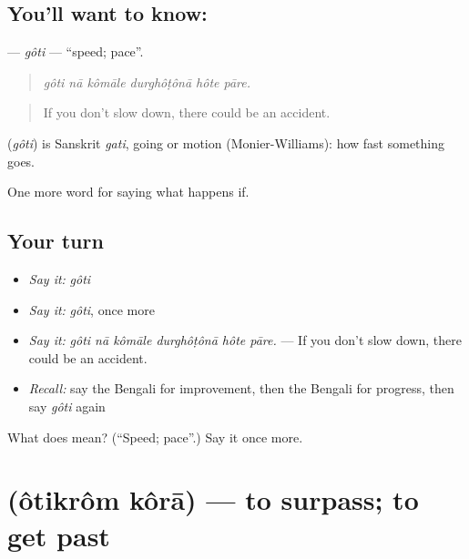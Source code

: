 \subsection*{You'll want to know: }
\textbf{} — \emph{gôti} — \textquotedblleft{}speed; pace\textquotedblright{}.

\begin{quote}
     
\end{quote}

\begin{quote}
\emph{gôti nā kômāle durghôṭônā hôte pāre.}
\end{quote}

\begin{quote}
If you don't slow down, there could be an accident.
\end{quote}

\begin{cousinweb}
\textbf{} (\emph{gôti}) is Sanskrit \emph{gati}, going or motion (Monier-Williams): how fast something goes.
\end{cousinweb}

\begin{grammarlens}[title={What you've built}]
One more word for saying what happens if.
\end{grammarlens}

\subsection*{Your turn}
\begin{itemize}
\raggedright
  \item \emph{Say it:} \emph{gôti}
  \item \emph{Say it:} \emph{gôti}, once more
  \item \emph{Say it:} \emph{gôti nā kômāle durghôṭônā hôte pāre.} — If you don't slow down, there could be an accident.
  \item \emph{Recall:} say the Bengali for improvement, then the Bengali for progress, then say \emph{gôti} again
\end{itemize}

\begin{tcolorbox}[breakable,colback=teal!4,colframe=teal!35!black,title={Before you move on}]
What does  mean? (\textquotedblleft{}Speed; pace\textquotedblright{}.) Say it once more.
\end{tcolorbox}
\section[\texorpdfstring{\bn{অতিক্রম} \bn{করা} (ôtikrôm kôrā)}{অতিক্রম করা (ôtikrôm kôrā)}]{  (ôtikrôm kôrā) — to surpass; to get past}

